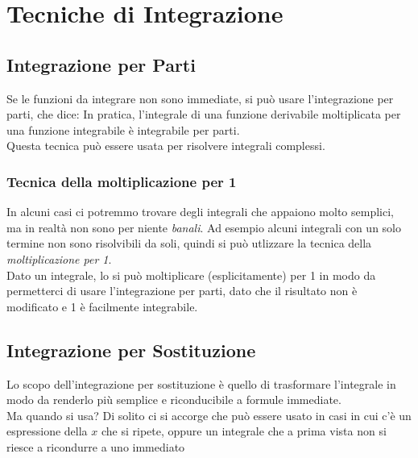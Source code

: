 \documentclass[12pt, a4paper, openany]{book}
\begin{document}
	\section{Tecniche di Integrazione}

	\subsection{Integrazione per Parti}
	Se le funzioni da integrare non sono immediate, si può usare l'integrazione per parti, che dice:
	In pratica, l'integrale di una funzione derivabile moltiplicata per una funzione integrabile è integrabile per parti.
	\\Questa tecnica può essere usata per risolvere integrali complessi.
	\subsubsection*{Tecnica della moltiplicazione per 1}
	In alcuni casi ci potremmo trovare degli integrali che appaiono molto semplici, ma in realtà non sono per niente \emph{banali}.
	Ad esempio alcuni integrali con un solo termine non sono risolvibili da soli, quindi si può utlizzare la tecnica della \emph{moltiplicazione per 1}.
	\\Dato un integrale, lo si può moltiplicare (esplicitamente) per 1 in modo da permetterci di usare l'integrazione per parti, dato che il risultato non è modificato e 1 è facilmente integrabile.


	\subsection{Integrazione per Sostituzione}
	Lo scopo dell'integrazione per sostituzione è quello di trasformare l'integrale in modo da renderlo più semplice
	e riconducibile a formule immediate.
	\\ Ma quando si usa? Di solito ci si accorge che può essere usato in casi in cui c'è un espressione della $x$ che si ripete,
	oppure un integrale che a prima vista non si riesce a ricondurre a uno immediato
\end{document}

